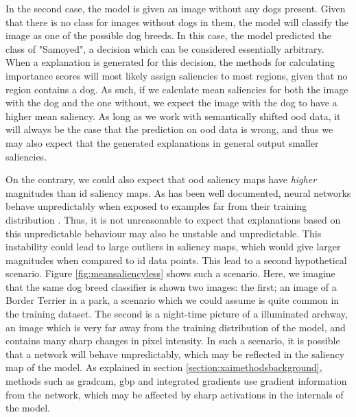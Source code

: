 \documentclass[UKenglish]{uiomasterthesis} %
\theoremstyle{definition}
\begin{document}
In the second case, the model is given an image without any dogs present. Given that there is no class for images without dogs in them, the model will classify the image as one of the possible dog breeds. In this case, the model predicted the class of "Samoyed", a decision which can be considered essentially arbitrary. When a explanation is generated for this decision, the methods for calculating importance scores will most likely assign saliencies to most regions, given that no region contains a dog. As such, if we calculate mean saliencies for both the image with the dog and the one without, we expect the image with the dog to have a higher mean saliency. As long as we work with semantically shifted \ac{ood} data, it will always be the case that the prediction on \ac{ood} data is wrong, and thus we may also expect that the generated explanations in general output smaller saliencies.

On the contrary, we could also expect that \ac{ood} saliency maps have {\it higher} magnitudes than \ac{id} saliency maps. As has been well documented, neural networks behave unpredictably when exposed to examples far from their training distribution \cite{nguyen2015deepneuralnetworkseasily, geirhos2020shortcut, goodfellow2015explainingharnessingadversarialexamples}. Thus, it is not unreasonable to expect that explanations based on this unpredictable behaviour may also be unstable and unpredictable. This instability could lead to large outliers in saliency maps, which would give larger magnitudes when compared to \ac{id} data points. This lead to a second hypothetical scenario. Figure \ref{fig:meansaliencyless} shows such a scenario. Here, we imagine that the same dog breed classifier is shown two images: the first; an image of a Border Terrier in a park, a scenario which we could assume is quite common in the training dataset. The second is a night-time picture of a illuminated archway, an image which is very far away from the training distribution of the model, and contains many sharp changes in pixel intensity. In such a scenario, it is possible that a network will behave unpredictably, which may be reflected in the saliency map of the model. As explained in section \ref{section:xaimethodsbackground}, methods such as \ac{gradcam}, \ac{gbp} and integrated gradients use gradient information from the network, which may be affected by sharp activations in the internals of the model.
\end{document}
